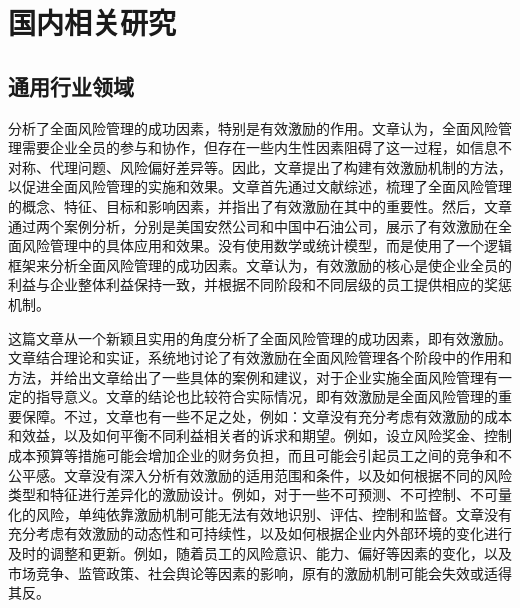 \documentclass[a4paper,12pt]{ctexart}
\begin{document}
\section{国内相关研究}
\subsection{通用行业领域}
\citet{王永海2011全面风险管理成功因素分析}分析了全面风险管理的成功因素，特别是有效激励的作用。文章认为，全面风险管理需要企业全员的参与和协作，但存在一些内生性因素阻碍了这一过程，如信息不对称、代理问题、风险偏好差异等。因此，文章提出了构建有效激励机制的方法，以促进全面风险管理的实施和效果。文章首先通过文献综述，梳理了全面风险管理的概念、特征、目标和影响因素，并指出了有效激励在其中的重要性。然后，文章通过两个案例分析，分别是美国安然公司和中国中石油公司，展示了有效激励在全面风险管理中的具体应用和效果。没有使用数学或统计模型，而是使用了一个逻辑框架来分析全面风险管理的成功因素。文章认为，有效激励的核心是使企业全员的利益与企业整体利益保持一致，并根据不同阶段和不同层级的员工提供相应的奖惩机制。

这篇文章从一个新颖且实用的角度分析了全面风险管理的成功因素，即有效激励。文章结合理论和实证，系统地讨论了有效激励在全面风险管理各个阶段中的作用和方法，并给出文章给出了一些具体的案例和建议，对于企业实施全面风险管理有一定的指导意义。文章的结论也比较符合实际情况，即有效激励是全面风险管理的重要保障。不过，文章也有一些不足之处，例如：文章没有充分考虑有效激励的成本和效益，以及如何平衡不同利益相关者的诉求和期望。例如，设立风险奖金、控制成本预算等措施可能会增加企业的财务负担，而且可能会引起员工之间的竞争和不公平感。文章没有深入分析有效激励的适用范围和条件，以及如何根据不同的风险类型和特征进行差异化的激励设计。例如，对于一些不可预测、不可控制、不可量化的风险，单纯依靠激励机制可能无法有效地识别、评估、控制和监督。文章没有充分考虑有效激励的动态性和可持续性，以及如何根据企业内外部环境的变化进行及时的调整和更新。例如，随着员工的风险意识、能力、偏好等因素的变化，以及市场竞争、监管政策、社会舆论等因素的影响，原有的激励机制可能会失效或适得其反。
\end{document}

